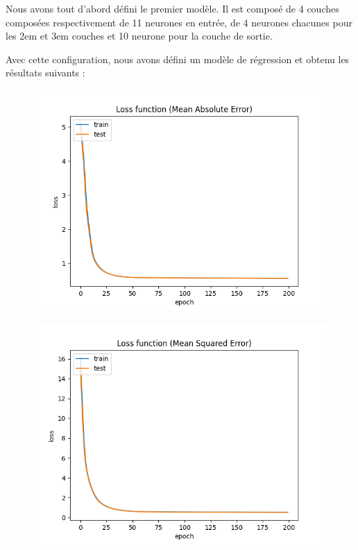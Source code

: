 Nous avons tout d'abord défini le premier modèle. Il est composé de 4 couches composées
respectivement de 11 neurones en entrée, de 4 neurones chacunes pour les 2em et 3em couches
et 10 neurone pour la couche de sortie.

Avec cette configuration, nous avons défini un modèle de régression et obtenu
les résultats suivants :

\vspace{1cm}
\begin{figure}[!htb]

    \begin{minipage}{0.5\textwidth}
        \centering
        \includegraphics[width=01\textwidth]{../images/11-4-4/Loss_function(Mean_Absolute_Error).png}
        \label{fig:11-4-4-1}
    \end{minipage}\hfill

    \begin{minipage}{0.5\textwidth}
        \centering
        \includegraphics[width=01\textwidth]{../images/11-4-4/Loss_function(Mean_Squared_Error).png}
        \label{fig:11-4-4-1_squared}
    \end{minipage}\hfill

\end{figure}

